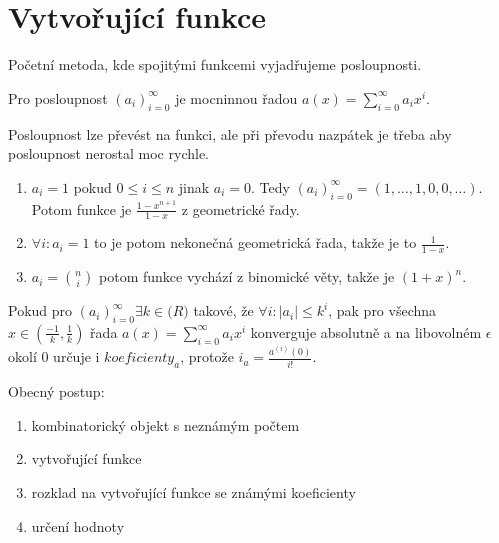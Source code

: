 \chapter{Vytvořující funkce}

Početní metoda, kde spojitými funkcemi vyjadřujeme posloupnosti.

\begin{definice}
	Pro posloupnost $(a_{i})_{i=0}^{\infty}$ je mocninnou řadou $a(x) = \sum_{i=0}^{\infty}a_{i}x^{i}$.
\end{definice}

Posloupnost lze převést na funkci, ale při převodu nazpátek je třeba aby posloupnost nerostal moc rychle.

\begin{prikl}
	\begin{enumerate}
		\item $a_i = 1$ pokud $0 \leq i \leq n$ jinak $a_i = 0$. Tedy $(a_i)_{i=0}^{\infty}=(1,\dots,1,0,0,\dots)$. Potom funkce je $\frac{1-x^{n+1}}{1-x}$ z geometrické řady.
		\item $\forall i: a_i = 1$ to je potom nekonečná geometrická řada, takže je to $\frac{1}{1-x}$.
		\item $a_i = \binom{n}{i}$ potom funkce vychází z binomické věty, takže je $(1+x)^{n}$.
	\end{enumerate}
\end{prikl}

\begin{tvrz}
	Pokud pro $(a_i)_{i=0}^{\infty} \exists k \in \mathbb(R)$ takové, že $\forall i: |a_i| \leq k^i$, pak pro všechna $x \in (\frac{-1}{k}, \frac{1}{k})$ řada $a(x) = \sum_{i=0}^{\infty}a_ix^i$ konverguje absolutně a na libovolném $\epsilon$ okolí 0 určuje i $koeficienty_a$, protože $i_a = \frac{a^{(i)}(0)}{i!}$.
\end{tvrz}


Obecný postup:

\begin{enumerate}
	\item kombinatorický objekt s neznámým počtem
	\item vytvořující funkce
	\item rozklad na vytvořující funkce se známými koeficienty
	\item určení hodnoty
\end{enumerate}

